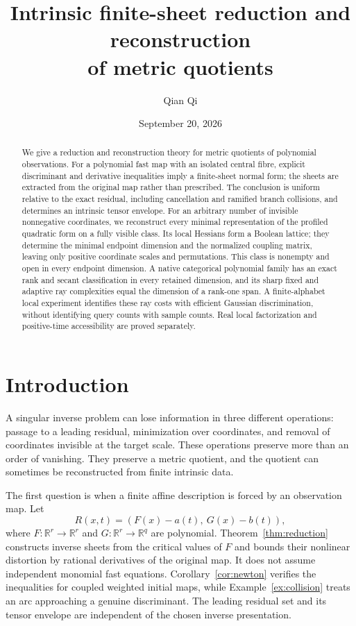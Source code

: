 \documentclass[11pt,reqno]{amsart}
\title[Intrinsic metric quotients]{Intrinsic finite-sheet reduction and reconstruction\\ of metric quotients}
\author{Qian Qi}
\date{September 20, 2026}
\numberwithin{equation}{section}
\theoremstyle{definition}
\theoremstyle{remark}
\newcommand{\R}{\mathbb R}
\begin{document}
\begin{abstract}
We give a reduction and reconstruction theory for metric quotients of polynomial observations. For a polynomial fast map with an isolated central fibre, explicit discriminant and derivative inequalities imply a finite-sheet normal form; the sheets are extracted from the original map rather than prescribed. The conclusion is uniform relative to the exact residual, including cancellation and ramified branch collisions, and determines an intrinsic tensor envelope. For an arbitrary number of invisible nonnegative coordinates, we reconstruct every minimal representation of the profiled quadratic form on a fully visible class. Its local Hessians form a Boolean lattice; they determine the minimal endpoint dimension and the normalized coupling matrix, leaving only positive coordinate scales and permutations. This class is nonempty and open in every endpoint dimension. A native categorical polynomial family has an exact rank and secant classification in every retained dimension, and its sharp fixed and adaptive ray complexities equal the dimension of a rank-one span. A finite-alphabet local experiment identifies these ray costs with efficient Gaussian discrimination, without identifying query counts with sample counts. Real local factorization and positive-time accessibility are proved separately.
\end{abstract}
\maketitle
\enlargethispage{3pt}

\section{Introduction}
A singular inverse problem can lose information in three different operations: passage to a leading residual, minimization over coordinates, and removal of coordinates invisible at the target scale. These operations preserve more than an order of vanishing. They preserve a metric quotient, and the quotient can sometimes be reconstructed from finite intrinsic data.

The first question is when a finite affine description is forced by an observation map. Let
\[
 R(x,t)=(F(x)-a(t),\ G(x)-b(t)),
\]
where $F:\R^r\to\R^r$ and $G:\R^r\to\R^q$ are polynomial. Theorem~\ref{thm:reduction} constructs inverse sheets from the critical values of $F$ and bounds their nonlinear distortion by rational derivatives of the original map. It does not assume independent monomial fast equations. Corollary~\ref{cor:newton} verifies the inequalities for coupled weighted initial maps, while Example~\ref{ex:collision} treats an arc approaching a genuine discriminant. The leading residual set and its tensor envelope are independent of the chosen inverse presentation.
\end{document}
